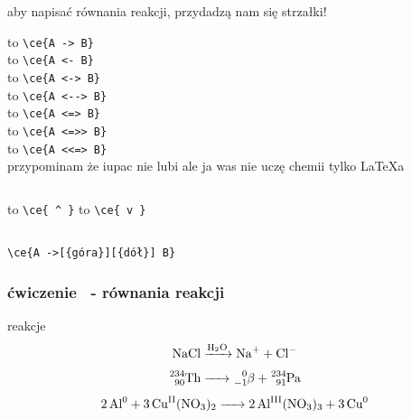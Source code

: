 \documentclass{beamer}
\theoremstyle{newblock}
\begin{document}
\begin{frame}[fragile]
    aby napisać równania reakcji, przydadzą nam się strzałki! \vspace*{2mm}
    
     to \verb|\ce{A -> B}|\\\vspace{1mm}
     to \verb|\ce{A <- B}|\\\vspace{1mm}
     to \verb|\ce{A <-> B}|\\\vspace{1mm}
     to \verb|\ce{A <--> B}|\\\vspace{1mm}
     to \verb|\ce{A <=> B}|\\\vspace{1mm}
     to \verb|\ce{A <=>> B}|\\\vspace{1mm}
     to \verb|\ce{A <<=> B}|\\
    \vspace*{3mm}
    \pause przypominam że iupac nie lubi  ale ja was nie uczę chemii tylko \LaTeX a
    \vspace{5mm}
    \pause    \begin{columns}
        \ce{ ^ } to \verb|\ce{ ^ }|         
         to \verb|\ce{ v }|
    \end{columns}
\end{frame}
\begin{frame}[fragile]
     \vspace{5mm}
    \verb|\ce{A ->[{góra}][{dół}] B}|
\end{frame}
\begin{frame}[fragile=singleslide]
    \frametitle{ćwiczenie \showmycounter \ - równania reakcji} 
    \begin{exampleblock}{reakcje}
        \begin{equation}
            \ce{NaCl ->[{H_2O}] Na+ + Cl-}
        \end{equation}
        \begin{equation}
            \ce{^234_90Th -> ^0_-1\beta{} + ^234_91Pa}
        \end{equation}
        \begin{equation}
            \ce{2Al^0 + 3Cu^{II}(NO3)2 -> 2Al^{III}(NO3)3 + 3Cu^{0}}
        \end{equation}
    \end{exampleblock}
\end{frame}
\end{document}
